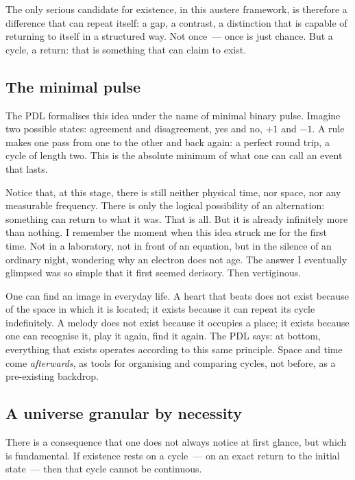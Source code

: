 \documentclass[12pt, a4paper, openright]{book}
\begin{document}
\medskip

The only serious candidate for existence, in this austere framework, is therefore a difference that can repeat itself: a gap, a contrast, a distinction that is capable of returning to itself in a structured way. Not once~--- once is just chance. But a cycle, a return: that is something that can claim to exist.

\subsection*{The minimal pulse}

The PDL formalises this idea under the name of minimal binary pulse. Imagine two possible states: agreement and disagreement, yes and no, $+1$ and $-1$. A rule makes one pass from one to the other and back again: a perfect round trip, a cycle of length two. This is the absolute minimum of what one can call an event that lasts.

\medskip

Notice that, at this stage, there is still neither physical time, nor space, nor any measurable frequency. There is only the logical possibility of an alternation: something can return to what it was. That is all. But it is already infinitely more than nothing. I remember the moment when this idea struck me for the first time. Not in a laboratory, not in front of an equation, but in the silence of an ordinary night, wondering why an electron does not age. The answer I eventually glimpsed was so simple that it first seemed derisory. Then vertiginous.

\medskip

One can find an image in everyday life. A heart that beats does not exist because of the space in which it is located; it exists because it can repeat its cycle indefinitely. A melody does not exist because it occupies a place; it exists because one can recognise it, play it again, find it again. The PDL says: at bottom, everything that exists operates according to this same principle. Space and time come \emph{afterwards}, as tools for organising and comparing cycles, not before, as a pre-existing backdrop.

\subsection*{A universe granular by necessity}

There is a consequence that one does not always notice at first glance, but which is fundamental. If existence rests on a cycle~--- on an exact return to the initial state~--- then that cycle cannot be continuous.
\end{document}
